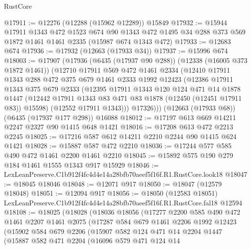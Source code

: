 \begin{lexlean}{RustCore}
\begin{coremodule}
@17911 := @12276 (@12288 (@15962 @12289)) @15849
@17932 := @15944
    @17911
    @1343
    @472
    @1523
    @674
    @90
    @1343
    @472
    @1495
    @34
    @288
    @373
    @569
    @1872
    @1461
    @1461
    @2335
    (@15987 @674 @1343 @472)
@17933 := @12683 @674
@17936 := @17932 (@12663 (@17933 @34))
@17937 := @15996 @674
@18003 := @17907
    (@17936
      (@6435 (@17937 @90 @288))
      (@12338 (@16005 @373 @1872 @1461))
      (@12710
        @17911
        @569
        @472
        @1461
        @2334
        (@12410
          @17911
          @1343
          @288
          @472
          @375
          @679
          @1461
          @2333
          @1992
          @12423
          (@12386
            @17911
            @1343
            @375
            @679
            @2333
            (@12395
              @17911
              @1343
              @120
              @124
              @471
              @14
              @1878
              @1447
              (@12442 @17911 @1343 @83 @471 @83 @1878 (@12450 (@12451 @17911 @83)) @15598)
              (@12552 @17911 @1343)))
          @17326)))
    (@12663 (@17933 @68))
    (@6435 (@17937 @177 @298))
    @16088
@18012 := @17197 @613 @669 @14211 @2247 @2327 @90 @1415 @648 @1421
@18016 := @17208 @613 @472 @2213 @2245
@18025 := @17216 @587 @612 @14211 @2210 @2244 @90 @1415 @624 @1421
@18028 := @15887 @587 @472 @2210
@18036 := @17244 @577 @585 @490 @472 @1461 @2200 @1461 @2210
@18045 := @15892 @575 @190 @279 @184 @1461 @1555 @1343 @917 @15929
@18046 := LexLeanPreserve.C1b912f4fc4d4e14a28bfb70aeef5f16f.R1.RustCore.look18
@18047 := @18045 @18046
@18048 := @12071 @917
@18050 := @18047 (@12579 @18048)
@18051 := @12094 @917
@18056 := @18050
    (@12583 @18051)
    LexLeanPreserve.C1b912f4fc4d4e14a28bfb70aeef5f16f.R1.RustCore.fal18
    @12594
@18108 := @18025
    (@18028
      (@18036
        @18056
        (@17277
          @2200
          @585
          @490
          @472
          @1461
          @2207
          @1461
          @2075
          (@17287
            @584
            @679
            @1461
            @2206
            @1992
            @12423
            (@15902
              @584
              @679
              @2206
              (@15907
                @582
                @124
                @471
                @14
                @2204
                @1447
                (@15887
                  @582
                  @471
                  @2204
                  (@16096
                    @579
                    @471
                    @124
                    @14

\end{coremodule}
\end{lexlean}
